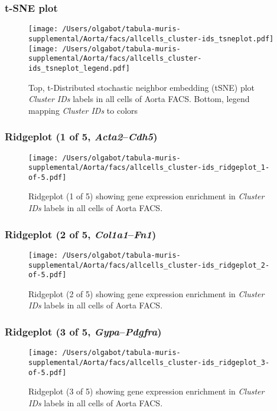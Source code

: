 \clearpage
\subsubsection{t-SNE plot}
\begin{figure}[h]
\centering
\texttt{[image: /Users/olgabot/tabula-muris-supplemental/Aorta/facs/allcells\_cluster-ids\_tsneplot.pdf]}
\texttt{[image: /Users/olgabot/tabula-muris-supplemental/Aorta/facs/allcells\_cluster-ids\_tsneplot\_legend.pdf]}
\caption{Top, t-Distributed stochastic neighbor embedding (tSNE) plot  \emph{Cluster IDs} labels in all cells of Aorta FACS. Bottom, legend mapping \emph{Cluster IDs} to colors}
\end{figure}


\clearpage

\subsubsection{Ridgeplot (1 of 5, \emph{Acta2}--\emph{Cdh5})}
\begin{figure}[h]
\centering
\texttt{[image: /Users/olgabot/tabula-muris-supplemental/Aorta/facs/allcells\_cluster-ids\_ridgeplot\_1-of-5.pdf]}

\caption{ Ridgeplot (1 of 5)  showing gene expression enrichment in \emph{Cluster IDs} labels in all cells of Aorta FACS. }
\end{figure}


\clearpage

\subsubsection{Ridgeplot (2 of 5, \emph{Col1a1}--\emph{Fn1})}
\begin{figure}[h]
\centering
\texttt{[image: /Users/olgabot/tabula-muris-supplemental/Aorta/facs/allcells\_cluster-ids\_ridgeplot\_2-of-5.pdf]}

\caption{ Ridgeplot (2 of 5)  showing gene expression enrichment in \emph{Cluster IDs} labels in all cells of Aorta FACS. }
\end{figure}


\clearpage

\subsubsection{Ridgeplot (3 of 5, \emph{Gypa}--\emph{Pdgfra})}
\begin{figure}[h]
\centering
\texttt{[image: /Users/olgabot/tabula-muris-supplemental/Aorta/facs/allcells\_cluster-ids\_ridgeplot\_3-of-5.pdf]}

\caption{ Ridgeplot (3 of 5)  showing gene expression enrichment in \emph{Cluster IDs} labels in all cells of Aorta FACS. }
\end{figure}


